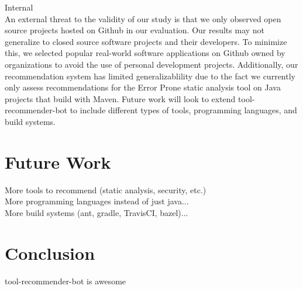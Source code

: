 \documentclass[conference]{IEEEtran}
\newcommand{\tool}{tool-recommender-bot }
\begin{document}
Internal\\

An external threat to the validity of our study is that we only observed open source projects hosted on Github in our evaluation. Our results may not generalize to closed source software projects and their developers. To minimize this, we selected popular real-world software applications on Github owned by organizations to avoid the use of personal development projects. Additionally, our recommendation system has limited generalizablility due to the fact we currently only assess recommendations for the Error Prone static analysis tool on Java projects that build with Maven. Future work will look to extend \tool to include different types of tools, programming languages, and build systems.

\section{Future Work}

More tools to recommend (static analysis, security, etc.) \\

More programming languages instead of just java...\\

More build systems (ant, gradle, TravisCI, bazel)...\\

\section{Conclusion}

\tool is awesome




  
%

\end{document}

